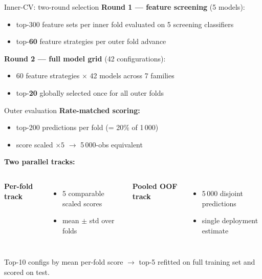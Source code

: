 \documentclass[aspectratio=169]{beamer}
\begin{document}
\begin{frame}{Inner-CV: two-round selection}
    \textbf{Round 1 --- feature screening} (5 models):
    \begin{itemize}
        \item top-300 feature sets per inner fold evaluated on 5 screening classifiers
        \item top-\textbf{60} feature strategies per outer fold advance
    \end{itemize}

    \vspace{0.4em}
    \textbf{Round 2 --- full model grid} (42 configurations):
    \begin{itemize}
        \item 60 feature strategies $\times$ 42 models across 7 families
        \item top-\textbf{20} globally selected once for all outer folds
    \end{itemize}

    \vspace{0.4em}
\end{frame}

\begin{frame}{Outer evaluation}
    \textbf{Rate-matched scoring:}
    \begin{itemize}
        \item top-200 predictions per fold (= 20\% of 1\,000)
        \item score scaled $\times 5$ $\to$ 5\,000-obs equivalent
    \end{itemize}

    \vspace{0.4em}
    \textbf{Two parallel tracks:}
    \begin{columns}[T,onlytextwidth]
        \textbf{Per-fold track}
        \begin{itemize}\small
            \item 5 comparable scaled scores
            \item mean $\pm$ std over folds
        \end{itemize}
        \textbf{Pooled OOF track}
        \begin{itemize}\small
            \item 5\,000 disjoint predictions
            \item single deployment estimate
        \end{itemize}
    \end{columns}

    \vspace{0.5em}
    Top-10 configs by mean per-fold score $\to$ top-5 refitted on full training set and scored on test.
\end{frame}
\end{document}
